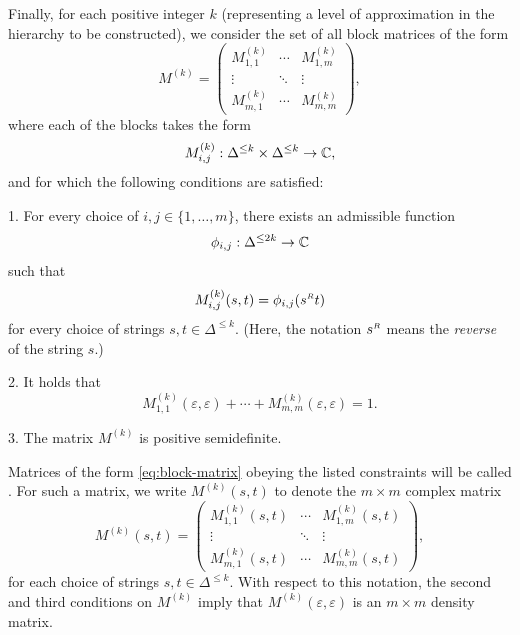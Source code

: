 Finally, for each positive integer $k$ (representing a level of approximation in
the hierarchy to be constructed), we consider the set of all block matrices of
the form
\begin{equation}
  \label{eq:block-matrix}
  M^{(k)}
  = \begin{pmatrix}
    M^{(k)}_{1,1} & \cdots & M^{(k)}_{1,m}\\
    \vdots & \ddots & \vdots\\
    M^{(k)}_{m,1} & \cdots & M^{(k)}_{m,m}
  \end{pmatrix},
\end{equation}
where each of the blocks takes the form
\begin{equation}
  M^{(k)}_{i,j} : \Delta^{\leq k} \times \Delta^{\leq k} \rightarrow \mathbb{C},
\end{equation}
and for which the following conditions are satisfied:
\begin{mylist}{\parindent}
\item[1.]
  For every choice of $i,j\in\{1,\ldots,m\}$, there exists an admissible
  function
  \begin{equation}
    \phi_{i,j}:\Delta^{\leq 2k}\rightarrow \mathbb{C}
  \end{equation}
  such that
  \begin{equation} \label{eq:enpa-mat-varphi}
    M^{(k)}_{i,j}(s,t) = \phi_{i,j}(s^{\mathsmaller{R}}t)
  \end{equation}
  for every choice of strings $s,t\in\Delta^{\leq k}$.
  (Here, the notation $s^{\mathsmaller{R}}$ means the \emph{reverse} of the
  string $s$.)
\item[2.]
  It holds that
  \begin{equation}
    \label{eq:pseudo-correlation-constraint-3}
    M^{(k)}_{1,1}(\varepsilon,\varepsilon) + \cdots +
    M^{(k)}_{m,m}(\varepsilon,\varepsilon) = 1.
  \end{equation}
\item[3.]
  The matrix $M^{(k)}$ is positive semidefinite.
\end{mylist}
Matrices of the form \eqref{eq:block-matrix} obeying the listed constraints will
be called .
For such a matrix, we write $M^{(k)}(s,t)$ to denote the $m\times m$ complex
matrix
\begin{equation}
  M^{(k)}(s,t)
  = \begin{pmatrix}
    M^{(k)}_{1,1}(s,t) & \cdots & M^{(k)}_{1,m}(s,t)\\
    \vdots & \ddots & \vdots\\
    M^{(k)}_{m,1}(s,t) & \cdots & M^{(k)}_{m,m}(s,t)
  \end{pmatrix},
\end{equation}
for each choice of strings $s,t\in\Delta^{\leq k}$.
With respect to this notation, the second and third conditions on $M^{(k)}$
imply that $M^{(k)}(\varepsilon,\varepsilon)$ is an $m\times m$ density matrix.

